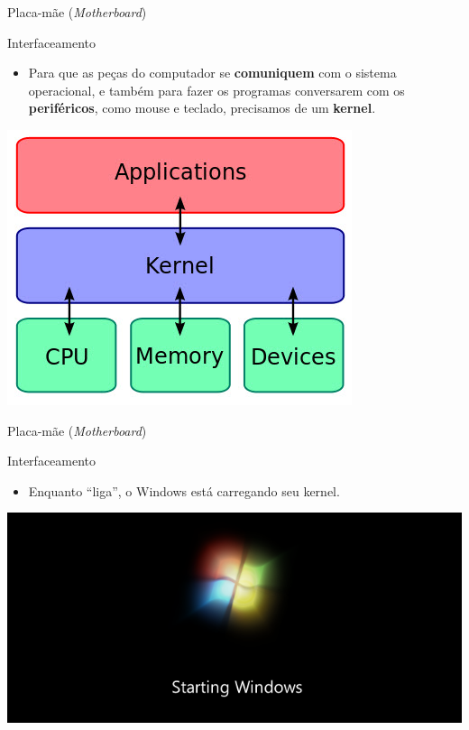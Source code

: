 \begin{frame}{Placa-mãe (\textit{Motherboard})}
	\begin{block}{Interfaceamento}
		\begin{itemize}
			\item Para que as peças do computador se \textbf{comuniquem} com o sistema operacional, e também para fazer os programas conversarem com os \textbf{periféricos}, como mouse e teclado, precisamos de um \textbf{kernel}.
		\end{itemize}
	\end{block}
	
	\centering
	\includegraphics[width=0.6\linewidth]{Figuras/Ch02/fig0}
\end{frame}


\begin{frame}{Placa-mãe (\textit{Motherboard})}
	\begin{block}{Interfaceamento}
		\begin{itemize}
			\item Enquanto ``liga'', o Windows está carregando seu kernel.
		\end{itemize}
	\end{block}
	
	\centering
	\includegraphics[width=1\linewidth]{Figuras/Ch02/fig0.1}
\end{frame}


